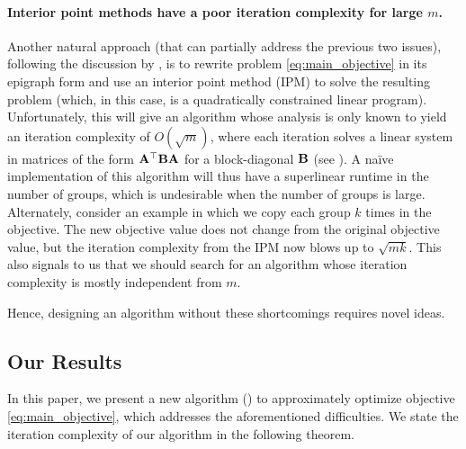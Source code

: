     \paragraph{Interior point methods have a poor iteration complexity for large $m$.} Another natural approach (that can partially address the previous two issues), following the discussion by \citet[Section 6.4]{boyd2004convex}, is to rewrite problem \ref{eq:main_objective} in its epigraph form and use an interior point method (IPM) to solve the resulting problem (which, in this case, is a quadratically constrained linear program). Unfortunately, this will give an algorithm whose analysis is only known to yield an iteration complexity of $O(\sqrt{m})$, where each iteration solves a linear system in matrices of the form $\mathbf{A}^{\top}\mathbf{B}\mathbf{A}$ for a block-diagonal $\mathbf{B}$ (see ).
    A na\"ive implementation of this algorithm will thus have a superlinear runtime in the number of groups, which is undesirable when the number of groups is large. Alternately, consider an example in which we copy each group $k$ times in the objective. The new objective value does not change from the original objective value, but the iteration complexity from the IPM now blows up to $\sqrt{mk}$. This also signals to us that we should search for an algorithm whose iteration complexity is mostly independent from $m$. %

Hence, designing an algorithm without these shortcomings requires novel ideas. 

\subsection{Our Results}
\label{sec:gp_our_results}

In this paper, we present a new algorithm () to approximately optimize objective \ref{eq:main_objective}, which addresses the aforementioned difficulties. We state the iteration complexity of our algorithm in the following theorem. 


